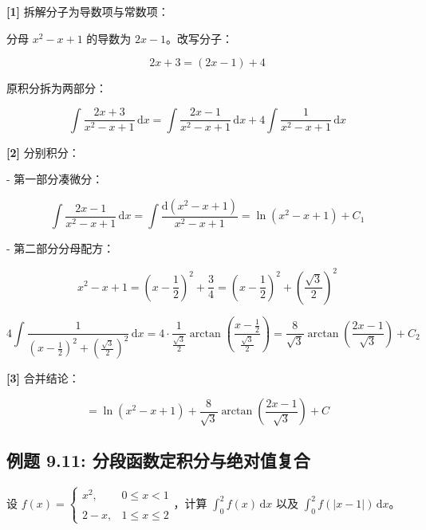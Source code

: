 \documentclass[11pt,a4paper,UTF8]{ctexart}
\begin{document}
\begin{solbox}[分步推导与答题规范]
\textbf{[1]} 拆解分子为导数项与常数项：

分母 $x^2-x+1$ 的导数为 $2x-1$。改写分子：


\begin{equation*}
2x + 3 = (2x - 1) + 4
\end{equation*}


原积分拆为两部分：


\begin{equation*}
\int \frac{2x+3}{x^2-x+1}\,\mathrm{d}x = \int \frac{2x-1}{x^2-x+1}\,\mathrm{d}x + 4\int \frac{1}{x^2-x+1}\,\mathrm{d}x
\end{equation*}


\textbf{[2]} 分别积分：

- 第一部分凑微分：


\begin{equation*}
\int \frac{2x-1}{x^2-x+1}\,\mathrm{d}x = \int \frac{\mathrm{d}(x^2-x+1)}{x^2-x+1} = \ln(x^2-x+1) + C_1
\end{equation*}


- 第二部分分母配方：


\begin{equation*}
x^2 - x + 1 = \left(x - \frac{1}{2}\right)^2 + \frac{3}{4} = \left(x - \frac{1}{2}\right)^2 + \left(\frac{\sqrt{3}}{2}\right)^2
\end{equation*}



\begin{equation*}
4\int \frac{1}{\left(x - \frac{1}{2}\right)^2 + \left(\frac{\sqrt{3}}{2}\right)^2}\,\mathrm{d}x = 4 \cdot \frac{1}{\frac{\sqrt{3}}{2}}\arctan\left(\frac{x - \frac{1}{2}}{\frac{\sqrt{3}}{2}}\right) = \frac{8}{\sqrt{3}}\arctan\left(\frac{2x-1}{\sqrt{3}}\right) + C_2
\end{equation*}


\textbf{[3]} 合并结论：


\begin{equation*}
= \ln(x^2-x+1) + \frac{8}{\sqrt{3}}\arctan\left(\frac{2x-1}{\sqrt{3}}\right) + C
\end{equation*}

\end{solbox}


\subsection{例题 9.11: 分段函数定积分与绝对值复合}

设 $f(x) = \begin{cases} x^2, & 0 \leqslant x < 1 \\ \\ 2-x, & 1 \leqslant x \leqslant 2 \end{cases}$，计算 $\int_0^2 f(x)\,\mathrm{d}x$ 以及 $\int_0^2 f(|x-1|)\,\mathrm{d}x$。
\end{document}
